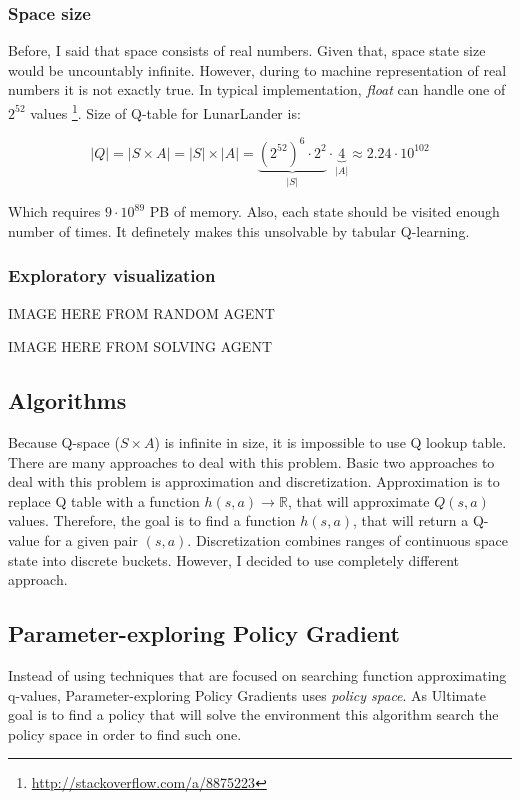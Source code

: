 \documentclass[12pt]{article}
\begin{document}
\subsubsection{Space size}

Before, I said that space consists of real numbers. Given that, space state size  would be uncountably infinite. However, during to machine representation of real numbers it is not exactly true. In typical implementation, \emph{float} can handle one of $2^{52}$ values \footnote{\url{http://stackoverflow.com/a/8875223}}. Size of Q-table for LunarLander is:

\begin{equation}
|Q| = |S \times A| = |S| \times |A| = \underbrace{{(2^{52})}^6 \cdot 2^2}_{|S|} \cdot \underbrace{4}_{|A|} \approx 2.24 \cdot 10^{102}
\end{equation}

Which requires $9 \cdot 10^{89}$ PB of memory. Also, each state should be visited enough number of times. It definetely makes this unsolvable by tabular Q-learning.
\subsubsection{Exploratory visualization}

IMAGE HERE FROM RANDOM AGENT

IMAGE HERE FROM SOLVING AGENT


\subsection{Algorithms}

Because Q-space ($S \times A$) is infinite in size, it is impossible to use Q lookup table. There are many approaches to deal with this problem. Basic two approaches to deal with this problem is approximation and discretization. Approximation is to replace Q table with a function $h(s,a) \rightarrow \mathbb{R}$, that will approximate $Q(s, a)$ values. Therefore, the goal is to find a function $h(s, a)$, that will return a Q-value for a given pair $(s,a)$. 
Discretization combines ranges of continuous space state into discrete buckets. However, I decided to use completely different approach.

\subsection{Parameter-exploring Policy Gradient}
Instead of using techniques that are focused on searching function approximating q-values, Parameter-exploring Policy Gradients\cite{pgpe} uses \emph{policy space}. As Ultimate goal is to find a policy that will solve the environment this algorithm search the policy space in order to find such one. 
\end{document}
